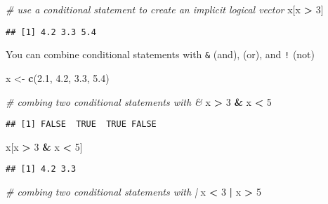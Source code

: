 \documentclass[
]{book}
\newenvironment{Shaded}{\begin{snugshade}}{\end{snugshade}}
\newcommand{\CommentTok}[1]{\textcolor[rgb]{0.56,0.35,0.01}{\textit{#1}}}
\newcommand{\DecValTok}[1]{\textcolor[rgb]{0.00,0.00,0.81}{#1}}
\newcommand{\FloatTok}[1]{\textcolor[rgb]{0.00,0.00,0.81}{#1}}
\newcommand{\KeywordTok}[1]{\textcolor[rgb]{0.13,0.29,0.53}{\textbf{#1}}}
\newcommand{\NormalTok}[1]{#1}
\newcommand{\OperatorTok}[1]{\textcolor[rgb]{0.81,0.36,0.00}{\textbf{#1}}}
\newcommand{\StringTok}[1]{\textcolor[rgb]{0.31,0.60,0.02}{#1}}
\begin{document}
\begin{Shaded}
\begin{Highlighting}[]
\CommentTok{\# use a conditional statement to create an implicit logical vector}
\NormalTok{x[x }\OperatorTok{\textgreater{}}\StringTok{ }\DecValTok{3}\NormalTok{]}
\end{Highlighting}
\end{Shaded}

\begin{verbatim}
## [1] 4.2 3.3 5.4
\end{verbatim}

You can combine conditional statements with \texttt{\&} (and), \texttt{\textbar{}} (or), and \texttt{!} (not)

\begin{Shaded}
\begin{Highlighting}[]
\NormalTok{x \textless{}{-}}\StringTok{ }\KeywordTok{c}\NormalTok{(}\FloatTok{2.1}\NormalTok{, }\FloatTok{4.2}\NormalTok{, }\FloatTok{3.3}\NormalTok{, }\FloatTok{5.4}\NormalTok{)}

\CommentTok{\# combing two conditional statements with \&}
\NormalTok{x }\OperatorTok{\textgreater{}}\StringTok{ }\DecValTok{3} \OperatorTok{\&}\StringTok{ }\NormalTok{x }\OperatorTok{\textless{}}\StringTok{ }\DecValTok{5}
\end{Highlighting}
\end{Shaded}

\begin{verbatim}
## [1] FALSE  TRUE  TRUE FALSE
\end{verbatim}

\begin{Shaded}
\begin{Highlighting}[]
\NormalTok{x[x }\OperatorTok{\textgreater{}}\StringTok{ }\DecValTok{3} \OperatorTok{\&}\StringTok{ }\NormalTok{x }\OperatorTok{\textless{}}\StringTok{ }\DecValTok{5}\NormalTok{]}
\end{Highlighting}
\end{Shaded}

\begin{verbatim}
## [1] 4.2 3.3
\end{verbatim}

\begin{Shaded}
\begin{Highlighting}[]
\CommentTok{\# combing two conditional statements with |}
\NormalTok{x }\OperatorTok{\textless{}}\StringTok{ }\DecValTok{3} \OperatorTok{|}\StringTok{ }\NormalTok{x }\OperatorTok{\textgreater{}}\StringTok{ }\DecValTok{5}
\end{Highlighting}
\end{Shaded}
\end{document}
